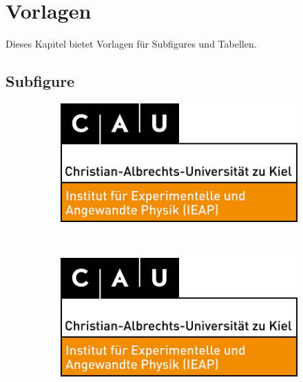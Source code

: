 \chapter{Vorlagen}\label{chap:Vorlagen}
Dieses Kapitel bietet Vorlagen für Subfigures und Tabellen.

\section{Subfigure}
\begin{figure}[H] %
    \begin{subfigure}{.45\linewidth}
        \centering
        \includegraphics[width=\linewidth]{./Bilder_2/MathFak.png}
        \caption{\label{fig:part_a}}
    \end{subfigure}%
    \\
    \begin{subfigure}{.275\linewidth}
        \centering
        \includegraphics[width=\linewidth]{./Bilder_2/MathFak.png}
        \caption{\label{fig:part_b}}
    \end{subfigure}%
    \hfill %
    \begin{subfigure}{.275\linewidth}
        \centering

\end{subfigure}
\end{figure}
